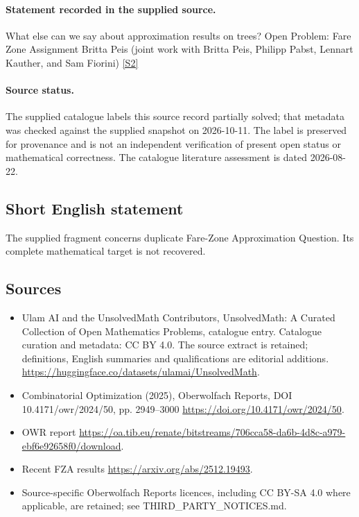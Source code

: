 \documentclass[11pt]{article}
\newcommand{\sref}[2]{\hyperlink{source:#1:#2}{[S#2]}}
\begin{document}
\paragraph{Statement recorded in the supplied source.}
What else can we say about approximation results on trees? Open Problem: Fare Zone Assignment Britta Peis (joint work with Britta Peis, Philipp Pabst, Lennart Kauther, and Sam Fiorini) \sref{statement}{2}
\paragraph{Source status.}
The supplied catalogue labels this source record partially solved; that metadata was checked against the supplied snapshot on 2026-10-11. The label is preserved for provenance and is not an independent verification of present open status or mathematical correctness. The catalogue literature assessment is dated 2026-08-22.
\subsection{Short English statement}
The supplied fragment concerns duplicate Fare-Zone Approximation Question. Its complete mathematical target is not recovered.
\subsection{Sources}
\begin{itemize}
\item[\hypertarget{source:statement:1}{S1}] Ulam AI and the UnsolvedMath Contributors, UnsolvedMath: A Curated Collection of Open Mathematics Problems, catalogue entry. Catalogue curation and metadata: CC BY 4.0. The source extract is retained; definitions, English summaries and qualifications are editorial additions.
\url{https://huggingface.co/datasets/ulamai/UnsolvedMath}.
\item[\hypertarget{source:statement:2}{S2}] Combinatorial Optimization (2025), Oberwolfach Reports, DOI 10.4171/owr/2024/50, pp. 2949--3000
\url{https://doi.org/10.4171/owr/2024/50}.
\item[\hypertarget{source:statement:3}{S3}] OWR report
\url{https://oa.tib.eu/renate/bitstreams/706cca58-da6b-4d8c-a979-ebf6e92658f0/download}.
\item[\hypertarget{source:statement:4}{S4}] Recent FZA results
\url{https://arxiv.org/abs/2512.19493}.
\item Source-specific Oberwolfach Reports licences, including CC BY-SA 4.0 where applicable, are retained; see THIRD\_PARTY\_NOTICES.md.
\end{itemize}
\end{document}
